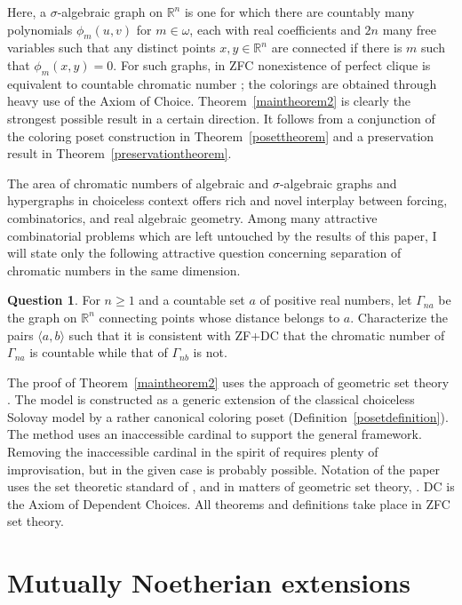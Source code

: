 \documentclass{article}
\newcommand{\gw}{\omega}
\newcommand{\gs}{\sigma}
\theoremstyle{definition}
\newtheorem{question}[theorem]{Question}
\begin{document}
\noindent Here, a $\gs$-algebraic graph on $\mathbb{R}^n$ is one for which there are countably many polynomials $\phi_m(u, v)$ for $m\in\gw$, each with real coefficients and $2n$ many free variables such that any distinct points $x, y\in\mathbb{R}^n$ are connected if there is $m$ such that $\phi_m(x, y)=0$. For such graphs, in ZFC nonexistence of perfect clique is equivalent to countable chromatic number \cite{schmerl:avoidable}; the colorings are obtained through heavy use of the Axiom of Choice. Theorem~\ref{maintheorem2} is clearly the strongest possible result in a certain direction. It follows from a conjunction of the coloring poset construction in Theorem~\ref{posettheorem} and a preservation result in Theorem~\ref{preservationtheorem}.

The area of chromatic numbers of algebraic and $\gs$-algebraic graphs and hypergraphs in choiceless context offers rich and novel interplay between forcing, combinatorics, and real algebraic geometry. Among many attractive combinatorial problems which are left untouched by the results of this paper, I will state only the following attractive question concerning separation of chromatic numbers in the same dimension.

\begin{question}
For $n\geq 1$ and a countable set $a$ of positive real numbers, let $\Gamma_{na}$ be the graph on $\mathbb{R}^n$ connecting points whose distance belongs to $a$. Characterize the pairs $\langle a, b\rangle$ such that it is consistent with ZF+DC that the chromatic number of $\Gamma_{na}$ is countable while that of $\Gamma_{nb}$ is not.
\end{question}

\noindent The proof of Theorem~\ref{maintheorem2} uses the approach of geometric set theory \cite{z:geometric}. The model is constructed as a generic extension of the classical choiceless Solovay model \cite[Theorem 26.14]{jech:newset} by a rather canonical coloring poset (Definition~\ref{posetdefinition}).  The method uses an inaccessible cardinal to support the general framework. Removing the inaccessible cardinal in the spirit of \cite{Sh:176} requires plenty of improvisation, but in the given case is probably possible. Notation of the paper uses the set theoretic standard of \cite{jech:newset}, and in matters of geometric set theory, \cite{z:geometric}. DC is the Axiom of Dependent Choices. All theorems and definitions take place in ZFC set theory. 

\section{Mutually Noetherian extensions}
\end{document}
